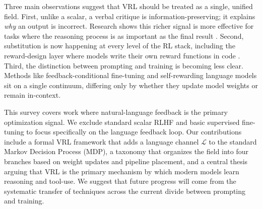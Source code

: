 Three main observations suggest that VRL should be treated as a single, unified field. First, unlike a scalar, a verbal critique is information-preserving; it explains \textit{why} an output is incorrect. Research shows this richer signal is more effective for tasks where the reasoning process is as important as the final result \citep{zhao2025genprm}. Second, substitution is now happening at every level of the RL stack, including the reward-design layer where models write their own reward functions in code \citep{ma2024eureka}. Third, the distinction between prompting and training is becoming less clear. Methods like feedback-conditional fine-tuning \citep{luo2025fcp} and self-rewarding language models \citep{yuan2025selfrewarding} sit on a single continuum, differing only by whether they update model weights or remain in-context.

This survey covers work where natural-language feedback is the primary optimization signal. We exclude standard scalar RLHF and basic supervised fine-tuning to focus specifically on the language feedback loop. Our contributions include a formal VRL framework that adds a language channel $\mathcal{L}$ to the standard Markov Decision Process (MDP), a taxonomy that organizes the field into four branches based on weight updates and pipeline placement, and a central thesis arguing that VRL is the primary mechanism by which modern models learn reasoning and tool-use. We suggest that future progress will come from the systematic transfer of techniques across the current divide between prompting and training.


